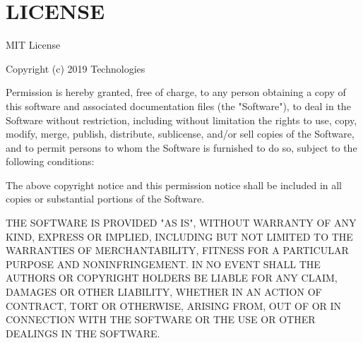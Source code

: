 \chapter{LICENSE}
\hypertarget{md__library_2_package_cache_2com_8unity_8ide_8vscode_0d1_82_85_2_l_i_c_e_n_s_e}{}\label{md__library_2_package_cache_2com_8unity_8ide_8vscode_0d1_82_85_2_l_i_c_e_n_s_e}
MIT License

Copyright (c) 2019  Technologies

Permission is hereby granted, free of charge, to any person obtaining a copy of this software and associated documentation files (the "{}\+Software"{}), to deal in the Software without restriction, including without limitation the rights to use, copy, modify, merge, publish, distribute, sublicense, and/or sell copies of the Software, and to permit persons to whom the Software is furnished to do so, subject to the following conditions\+:

The above copyright notice and this permission notice shall be included in all copies or substantial portions of the Software.

THE SOFTWARE IS PROVIDED "{}\+AS IS"{}, WITHOUT WARRANTY OF ANY KIND, EXPRESS OR IMPLIED, INCLUDING BUT NOT LIMITED TO THE WARRANTIES OF MERCHANTABILITY, FITNESS FOR A PARTICULAR PURPOSE AND NONINFRINGEMENT. IN NO EVENT SHALL THE AUTHORS OR COPYRIGHT HOLDERS BE LIABLE FOR ANY CLAIM, DAMAGES OR OTHER LIABILITY, WHETHER IN AN ACTION OF CONTRACT, TORT OR OTHERWISE, ARISING FROM, OUT OF OR IN CONNECTION WITH THE SOFTWARE OR THE USE OR OTHER DEALINGS IN THE SOFTWARE. 